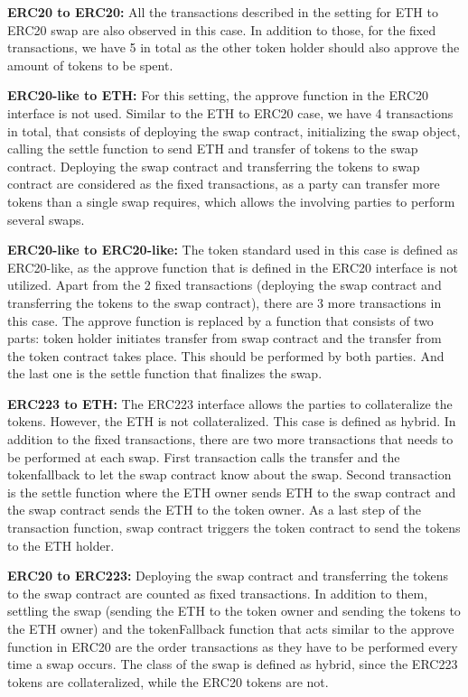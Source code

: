 \textbf{ERC20 to ERC20:} All the transactions described in the setting for ETH to ERC20 swap are also observed in this case. In addition to those, for the fixed transactions, we have 5 in total as the other token holder should also approve the amount of tokens to be spent.

\textbf{ERC20-like to ETH:} For this setting, the approve function in the ERC20 interface is not used. Similar to the ETH to ERC20 case, we have 4 transactions in total, that consists of deploying the swap contract, initializing the swap object, calling the settle function to send ETH and transfer of tokens to the swap contract. Deploying the swap contract and transferring the tokens to swap contract are considered as the fixed transactions, as a party can transfer more tokens than a single swap requires, which allows the involving parties to perform several swaps.

\textbf{ERC20-like to ERC20-like:} The token standard used in this case is defined as ERC20-like, as the approve function that is defined in the ERC20 interface is not utilized. Apart from the 2 fixed transactions (deploying the swap contract and transferring the tokens to the swap contract), there are 3 more transactions in this case. The approve function is replaced by a function that consists of two parts: token holder initiates transfer from swap contract and the transfer from the token contract takes place. This should be performed by both parties. And the last one is the settle function that finalizes the swap.

\textbf{ERC223 to ETH:} The ERC223 interface allows the parties to collateralize the tokens. However, the ETH is not collateralized. This case is defined as hybrid. In addition to the fixed transactions, there are two more transactions that needs to be performed at each swap. First transaction calls the transfer and the tokenfallback to let the swap contract know about the swap. Second transaction is the settle function where the ETH owner sends ETH to the swap contract and the swap contract sends the ETH to the token owner. As a last step of the transaction function, swap contract triggers the token contract to send the tokens to the ETH holder.

\textbf{ERC20 to ERC223:} Deploying the swap contract and transferring the tokens to the swap contract are counted as fixed transactions. In addition to them, settling the swap (sending the ETH to the token owner and sending the tokens to the ETH owner) and the tokenFallback function that acts similar to the approve function in ERC20 are the order transactions as they have to be performed every time a swap occurs. The class of the swap is defined as hybrid, since the ERC223 tokens are collateralized, while the ERC20 tokens are not.

